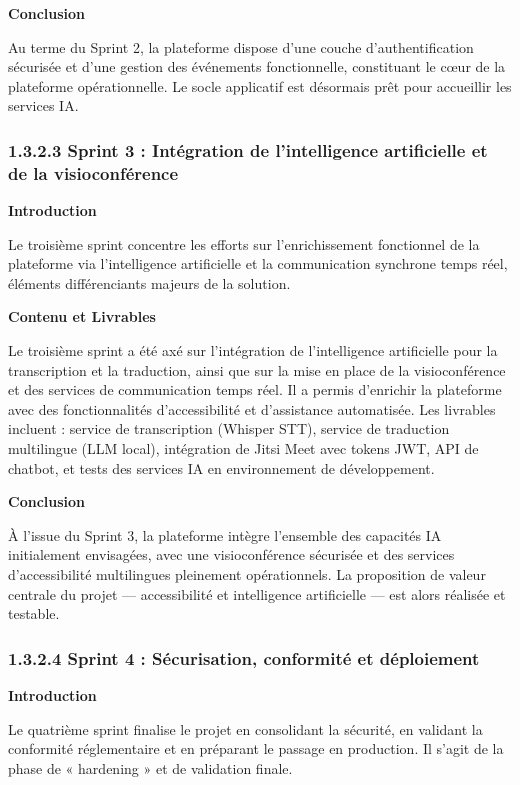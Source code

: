 \textbf{Conclusion}

Au terme du Sprint 2, la plateforme dispose d'une couche d'authentification sécurisée et d'une gestion des événements fonctionnelle, constituant le cœur de la plateforme opérationnelle. Le socle applicatif est désormais prêt pour accueillir les services IA.

\subsubsection{1.3.2.3 Sprint 3 : Intégration de l'intelligence artificielle et de la visioconférence}

\textbf{Introduction}

Le troisième sprint concentre les efforts sur l'enrichissement fonctionnel de la plateforme via l'intelligence artificielle et la communication synchrone temps réel, éléments différenciants majeurs de la solution.

\textbf{Contenu et Livrables}

Le troisième sprint a été axé sur l'intégration de l'intelligence artificielle pour la transcription et la traduction, ainsi que sur la mise en place de la visioconférence et des services de communication temps réel. Il a permis d'enrichir la plateforme avec des fonctionnalités d'accessibilité et d'assistance automatisée. Les livrables incluent : service de transcription (Whisper STT), service de traduction multilingue (LLM local), intégration de Jitsi Meet avec tokens JWT, API de chatbot, et tests des services IA en environnement de développement.

\textbf{Conclusion}

À l'issue du Sprint 3, la plateforme intègre l'ensemble des capacités IA initialement envisagées, avec une visioconférence sécurisée et des services d'accessibilité multilingues pleinement opérationnels. La proposition de valeur centrale du projet — accessibilité et intelligence artificielle — est alors réalisée et testable.

\subsubsection{1.3.2.4 Sprint 4 : Sécurisation, conformité et déploiement}

\textbf{Introduction}

Le quatrième sprint finalise le projet en consolidant la sécurité, en validant la conformité réglementaire et en préparant le passage en production. Il s'agit de la phase de « hardening » et de validation finale.

